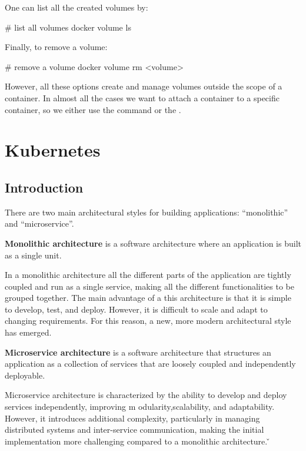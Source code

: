 One can list all the created volumes by:

\begin{bash}
# list all volumes
docker volume ls
\end{bash}

Finally, to remove a volume:

\begin{bash}
# remove a volume
docker volume rm <volume>
\end{bash}

However, all these options create and manage volumes outside the scope of a container. In almost all the cases we
want to attach a container to a specific container, so we either use the  command or the
.

\section{Kubernetes}\label{sec:kubernetes}

\subsection{Introduction}

There are two main architectural styles for building applications: ``monolithic'' and ``microservice''.

\textbf{Monolithic architecture} is a software architecture where an application is built as a single unit.
\ed

In a monolithic architecture all the different parts of the application are tightly coupled and run as a single service,
making all the different functionalities to be grouped together. The main advantage of a this architecture is that
it is simple to develop, test, and deploy. However, it is difficult to scale and adapt to changing requirements. For
this reason, a new, more modern architectural style has emerged.

\textbf{Microservice architecture} is a software architecture  that structures an application as a collection of
services that are loosely coupled and independently deployable.
\ed

Microservice architecture is characterized by the ability to develop and deploy services independently, improving m
odularity,scalability, and adaptability. However, it introduces additional complexity, particularly in managing
distributed systems and inter-service communication, making the initial implementation more challenging compared to a
monolithic architecture. \v

